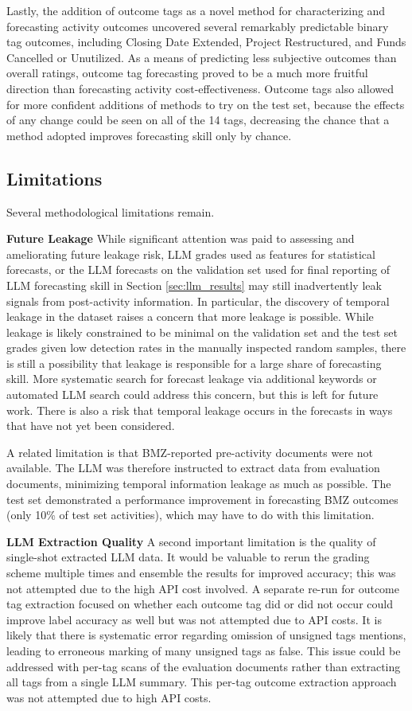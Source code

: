 \documentclass[12pt,a4paper]{article}
\begin{document}
Lastly, the addition of outcome tags as a novel method for characterizing and forecasting activity outcomes uncovered several remarkably predictable binary tag outcomes, including Closing Date Extended, Project Restructured, and Funds Cancelled or Unutilized. As a means of predicting less subjective outcomes than overall ratings, outcome tag forecasting proved to be a much more fruitful direction than forecasting activity cost-effectiveness. Outcome tags also allowed for more confident additions of methods to try on the test set, because the effects of any change could be seen on all of the 14 tags, decreasing the chance that a method adopted improves forecasting skill only by chance.

\subsection{Limitations}
Several methodological limitations remain.

\textbf{Future Leakage}
While significant attention was paid to assessing and ameliorating future leakage risk, LLM grades used as features for statistical forecasts, or the LLM forecasts on the validation set used for final reporting of LLM forecasting skill in Section \ref{sec:llm_results} may still inadvertently leak signals from post-activity information. In particular, the discovery of temporal leakage in the dataset raises a concern that more leakage is possible. While leakage is likely constrained to be minimal on the validation set and the test set grades given low detection rates in the manually inspected random samples, there is still a possibility that leakage is responsible for a large share of forecasting skill. More systematic search for forecast leakage via additional keywords or automated LLM search could address this concern, but this is left for future work. There is also a risk that temporal leakage occurs in the forecasts in ways that have not yet been considered. 

A related limitation is that BMZ-reported pre-activity documents were not available. The LLM was therefore instructed to extract data from evaluation documents, minimizing temporal information leakage as much as possible. The test set demonstrated a performance improvement in forecasting BMZ outcomes (only 10\% of test set activities), which may have to do with this limitation.

\textbf{LLM Extraction Quality}
A second important limitation is the quality of single-shot extracted LLM data. It would be valuable to rerun the grading scheme multiple times and ensemble the results for improved accuracy; this was not attempted due to the high API cost involved. A separate re-run for outcome tag extraction focused on whether each outcome tag did or did not occur could improve label accuracy as well but was not attempted due to API costs. It is likely that there is systematic error regarding omission of unsigned tags mentions, leading to erroneous marking of many unsigned tags as false. This issue could be addressed with per-tag scans of the evaluation documents rather than extracting all tags from a single LLM summary. This per-tag outcome extraction approach was not attempted due to high API costs.
\end{document}

